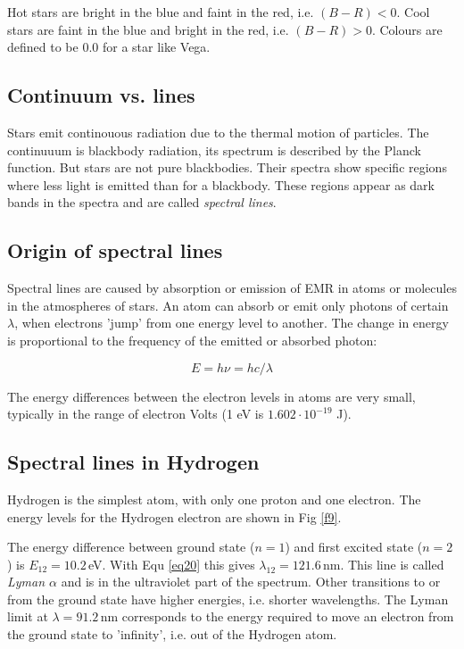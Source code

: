 Hot stars are bright in the blue and faint in the red, i.e. $(B-R)<0$. Cool stars are faint in the blue and bright in the red, i.e. $(B-R)>0$. Colours are defined to be 0.0 for a star like Vega.

\subsection{Continuum vs. lines}

Stars emit continouous radiation due to the thermal motion of particles. The continuuum is blackbody radiation, its spectrum is described by the Planck function. But stars are not pure blackbodies. Their spectra show specific regions where less light is emitted than for a blackbody. These regions appear as dark bands in the spectra and are called \textit{spectral lines}.

\subsection{Origin of spectral lines}

Spectral lines are caused by absorption or emission of EMR in atoms or molecules in the atmospheres of stars. An atom can absorb or emit only photons of certain $\lambda$, when electrons 'jump' from one energy level to another. The change in energy is proportional to the frequency of the emitted or absorbed photon:

\begin{equation}
E = h \nu = h c / \lambda
\label{eq20}
\end{equation}

The energy differences between the electron levels in atoms are very small, typically in the range of electron Volts (1 eV is $1.602\cdot10^{-19}$ J).

\subsection{Spectral lines in Hydrogen}

Hydrogen is the simplest atom, with only one proton and one electron. The energy levels for the Hydrogen electron are shown in Fig \ref{f9}.

The energy difference between ground state ($n=1$) and first excited state  ($n=2$) is $E_{12} = 10.2$\,eV. With Equ \eqref{eq20} this gives $\lambda_{12} = 121.6$\,nm. This line is called \textit{Lyman $\alpha$} and is in the ultraviolet part of the spectrum. Other transitions to or from the ground state have higher energies, i.e. shorter wavelengths. The Lyman limit at $\lambda = 91.2$\,nm corresponds to the energy required to move an electron from the ground state to 'infinity', i.e. out of the Hydrogen atom.

